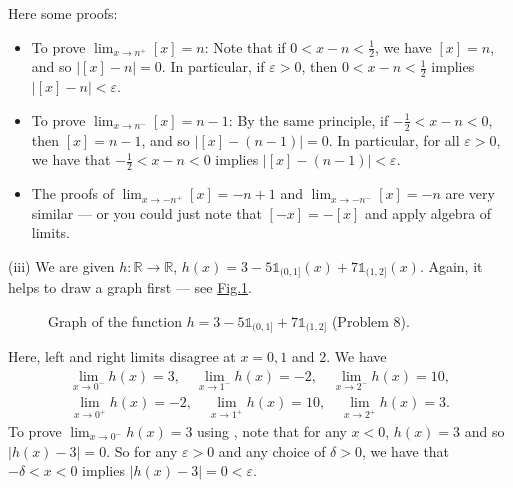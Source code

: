 \documentclass[letterpaper,10pt,english]{jupyterBook}
\let\sphinxpxdimen\pdfpxdimen\else\newdimen\sphinxpxdimen
\begin{document}
\sphinxAtStartPar
Here some proofs:
\begin{itemize}
\item {} 
\sphinxAtStartPar
To prove \(\lim_{x \rightarrow n^+}[x] = n\): Note that if \(0<x-n<\frac{1}{2}\), we have \([x]=n\), and so \(|[x]-n|=0\). In particular, if \(\varepsilon>0\), then \(0<x-n<\frac{1}{2}\) implies \(|[x]-n|<\varepsilon\).

\item {} 
\sphinxAtStartPar
To prove \(\lim_{x\rightarrow n^-}[x]=n-1\): By the same principle, if \(-\frac{1}{2}<x-n<0\), then \([x]=n-1\), and so \(|[x]-(n-1)|=0\). In particular, for all \(\varepsilon>0\), we have that \(-\frac{1}{2}<x-n<0\) implies \(|[x]-(n-1)|<\varepsilon\).

\item {} 
\sphinxAtStartPar
The proofs of \(\lim_{x\rightarrow -n^+}[x]= -n+1\) and \(\lim_{x\rightarrow -n^-}[x]=-n\) are very similar — or you could just note that \([-x]=-[x]\) and apply algebra of limits.

\end{itemize}

\sphinxAtStartPar
(iii) We are given \(h:\mathbb{R}\to\mathbb{R}\), \(h(x) =3 - 5\mathbb{1}_{(0, 1]}(x) + 7\mathbb{1}_{(1, 2]}(x)\). Again, it helps to draw a graph first — see \hyperref[\detokenize{Solutions-upto46:id4}]{Fig.\@ \ref{\detokenize{Solutions-upto46:id4}}}.

\begin{figure}[htbp]
\centering
\capstart

\noindent\sphinxincludegraphics[width=500\sphinxpxdimen]{{8iii}.png}
\caption{Graph of the function \(h=3 - 5\mathbb{1}_{(0, 1]} + 7\mathbb{1}_{(1, 2]}\) (Problem 8).}\label{\detokenize{Solutions-upto46:id4}}\end{figure}

\sphinxAtStartPar
Here, left and right limits disagree at \(x = 0, 1\) and \(2\). We have
\begin{equation*}
\begin{split}
\lim_{x \rightarrow 0^-}h(x) = 3, \hspace{1em} \lim_{x \rightarrow 1^-}h(x) = -2, \hspace{1em}  \lim_{x \rightarrow 2^-}h(x) = 10,
\end{split}
\end{equation*}\begin{equation*}
\begin{split}
\lim_{x \rightarrow 0^+}h(x) = -2, \hspace{1em} \lim_{x \rightarrow 1^+}h(x) = 10, \hspace{1em}  \lim_{x \rightarrow 2^+}h(x) = 3.
\end{split}
\end{equation*}
\sphinxAtStartPar
To prove \(\lim_{x \rightarrow 0^-}h(x) = 3\) using , note that for any \(x<0\), \(h(x)=3\) and so \(|h(x)-3|=0\). So for any \(\varepsilon>0\) and any choice of \(\delta>0\), we have that \(-\delta<x<0\) implies \(|h(x)-3|=0<\varepsilon\).
\end{document}

